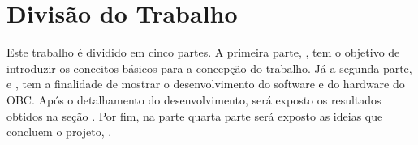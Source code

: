 \section{Divisão do Trabalho}

Este trabalho é dividido em cinco partes. A primeira parte, , tem o objetivo de introduzir os conceitos básicos para a concepção do trabalho. Já a segunda parte,  e , tem a finalidade de mostrar o desenvolvimento do software e do hardware do OBC. Após o detalhamento do desenvolvimento, será exposto os resultados obtidos na seção . Por fim, na parte quarta parte será exposto as ideias que concluem o projeto, .